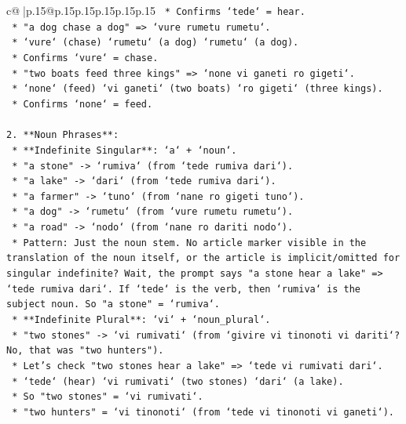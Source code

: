 \documentclass{article}
\begin{document}
{\begin{supertabular}{c@{$\;$}|p{.15\linewidth}@{}p{.15\linewidth}p{.15\linewidth}p{.15\linewidth}p{.15\linewidth}p{.15\linewidth}}
{{{\texttt{        *   Confirms `tede` = hear.} \\
\texttt{    *   "a dog chase a dog" => `vure rumetu rumetu`.} \\
\texttt{        *   `vure` (chase) `rumetu` (a dog) `rumetu` (a dog).} \\
\texttt{        *   Confirms `vure` = chase.} \\
\texttt{    *   "two boats feed three kings" => `none vi ganeti ro gigeti`.} \\
\texttt{        *   `none` (feed) `vi ganeti` (two boats) `ro gigeti` (three kings).} \\
\texttt{        *   Confirms `none` = feed.} \\
\\ 
\texttt{2.  **Noun Phrases**:} \\
\texttt{    *   **Indefinite Singular**: `a` + `noun`.} \\
\texttt{        *   "a stone" {-}> `rumiva` (from `tede rumiva dari`).} \\
\texttt{        *   "a lake" {-}> `dari` (from `tede rumiva dari`).} \\
\texttt{        *   "a farmer" {-}> `tuno` (from `nane ro gigeti tuno`).} \\
\texttt{        *   "a dog" {-}> `rumetu` (from `vure rumetu rumetu`).} \\
\texttt{        *   "a road" {-}> `nodo` (from `nane ro dariti nodo`).} \\
\texttt{        *   Pattern: Just the noun stem. No article marker visible in the translation of the noun itself, or the article is implicit/omitted for singular indefinite? Wait, the prompt says "a stone hear a lake" => `tede rumiva dari`. If `tede` is the verb, then `rumiva` is the subject noun. So "a stone" = `rumiva`.} \\
\texttt{    *   **Indefinite Plural**: `vi` + `noun\_plural`.} \\
\texttt{        *   "two stones" {-}> `vi rumivati` (from `givire vi tinonoti vi dariti`? No, that was "two hunters").} \\
\texttt{        *   Let's check "two stones hear a lake" => `tede vi rumivati dari`.} \\
\texttt{            *   `tede` (hear) `vi rumivati` (two stones) `dari` (a lake).} \\
\texttt{            *   So "two stones" = `vi rumivati`.} \\
\texttt{            *   "two hunters" = `vi tinonoti` (from `tede vi tinonoti vi ganeti`).} \\
}}}
\end{supertabular}}
\end{document}

